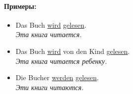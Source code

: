 \documentclass[12pt]{report}
\newcommand{\satzew}[1]{\underline{#1}}
\newcommand{\ubersatze}[1]{\textit{#1}}
\begin{document}
\paragraph{Примеры:}
\begin{itemize}
\item Das Buch \satzew{wird} \satzew{gelesen}.
~\\ \ubersatze{Эта книга читается.}
\item Das Buch \satzew{wird} von den Kind \satzew{gelesen}.
~\\ \ubersatze{Эта книга читается ребенку.}
\item Die Bucher \satzew{werden} \satzew{gelesen}.
~\\ \ubersatze{Эти книги читаются.}
\end{itemize}
\end{document}
